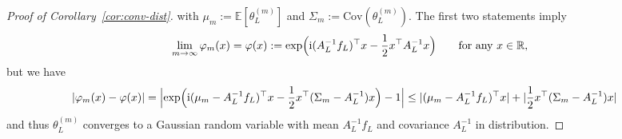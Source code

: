 \documentclass[11pt,english]{article}
\theoremstyle{plain}
\theoremstyle{plain}
\theoremstyle{plain}
\theoremstyle{plain}
\numberwithin{equation}{section}
\begin{document}
\begin{proof}[Proof of Corollary~\ref{cor:conv-dist}]
{		with $\mu_{m}:=\mathbb{E}[\theta_{L}^{(m)}]$ and $\Sigma_{m}:=\mathrm{Cov}(\theta_{L}^{(m)})$.
		The first two statements imply
		\[
			\lim_{m\to\infty}\varphi_{m}(x)=\varphi(x):=\exp\Bigl(\mathrm{i}(A_{L}^{-1}f_{L})^{\top}x-\frac{1}{2}x^{\top}A_{L}^{-1}x\Bigr)\qquad\text{for any \ensuremath{x\in\mathrm{\mathbb{R}}},}
		\]
		but we have
		\begin{align*}
			|\varphi_{m}(x)-\varphi(x)| & =\Bigl|\exp\Bigl(\mathrm{i}(\mu_{m}-A_{L}^{-1}f_{L})^{\top}x-\frac{1}{2}x^{\top}(\Sigma_{m}-A_{L}^{-1})x\Bigr)-1\Bigr|  \leq|(\mu_{m}-A_{L}^{-1}f_{L})^{\top}x|+|\frac{1}{2}x^{\top}(\Sigma_{m}-A_{L}^{-1})x|
		\end{align*}
		and thus $\theta_{L}^{(m)}$ converges to a Gaussian random variable
		with mean $A_{L}^{-1}f_{L}$ and covariance $A_{L}^{-1}$
		in distribution.}
		\fi
\end{proof}
\end{document}
